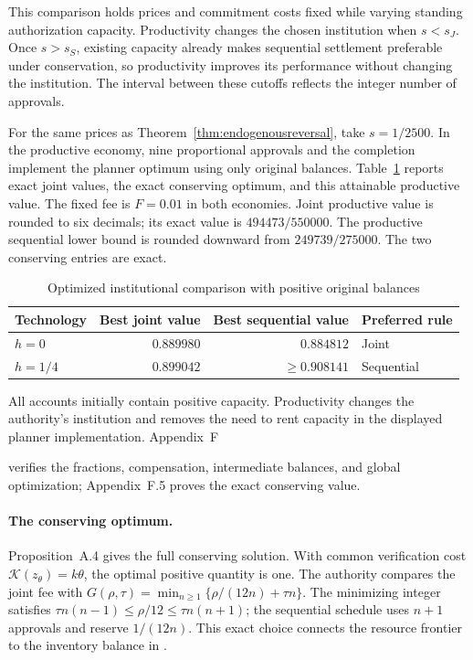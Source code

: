 \documentclass[ecta,draft]{econsocart}
\theoremstyle{definition}
\theoremstyle{definition}
\begin{document}
This comparison holds prices and commitment costs fixed while
varying standing authorization capacity. Productivity changes the
chosen institution when $s<s_J$. Once $s>s_S$, existing capacity
already makes sequential settlement preferable under conservation,
so productivity improves its performance without changing the
institution. The interval between these cutoffs reflects the
integer number of approvals.

For the same prices as Theorem~\ref{thm:endogenousreversal}, take
$s=1/2500$. In the productive economy, nine proportional approvals
and the completion implement the planner optimum using only original
balances. Table~\ref{tab:positivereversal} reports exact joint values,
the exact conserving optimum, and this attainable productive value.
The fixed fee is $F=0.01$ in both economies. Joint productive value is
rounded to six decimals; its exact value is $494473/550000$. The
productive sequential lower bound is rounded downward from
$249739/275000$. The two conserving entries are exact.

\begin{table}[!htbp]
\centering
\caption{Optimized institutional comparison with positive original balances}
\label{tab:positivereversal}
\begin{tabularx}{\linewidth}{@{}>{\raggedright\arraybackslash}Xrrl@{}}
\toprule
Technology & Best joint value & Best sequential value & Preferred rule\\
\midrule
$h=0$ & $0.889980$ & $0.884812$ & Joint\\
$h=1/4$ & $0.899042$ & $\geq0.908141$ & Sequential\\
\bottomrule
\end{tabularx}
\end{table}

All accounts initially contain positive capacity. Productivity changes
the authority's institution and removes the need to rent capacity in
the displayed planner implementation. Appendix~F%

verifies the fractions, compensation, intermediate balances, and global
optimization; Appendix~F.5%
 proves the exact
conserving value.


\paragraph{The conserving optimum.}
Proposition~A.4%
 gives the full conserving solution.
With common verification cost $\mathcal K(z_\theta)=k\theta$, the optimal
positive quantity is one. The authority compares the joint fee with
$G(\rho,\tau)=\min_{n\geq1}\{\rho/(12n)+\tau n\}$.
The minimizing integer satisfies
$\tau n(n-1)\leq\rho/12\leq\tau n(n+1)$; the sequential schedule
uses $n+1$ approvals and reserve $1/(12n)$. This exact choice connects
the resource frontier to the inventory balance in \citet{Baumol1952}.
\end{document}
